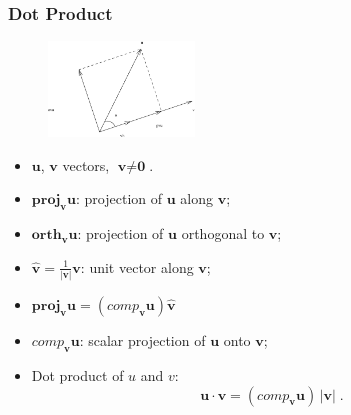 \begin{frame}
 \frametitle{Dot Product}

\begin{figure}[h]
  \includegraphics[height=1in]{../images/ok-dot_product.eps}
\end{figure}

\begin{itemize}
\item $\textbf{u}$, $\textbf{v}$ vectors, $\textbf{v}\neq \textbf{0}$.

\item $\textbf{proj}_{\bm{v}} \textbf{u}$: projection of $\textbf{u}$ along $\textbf{v}$;

  \item $\textbf{orth}_{\bm{v}} \textbf{u}$: projection of $\textbf{u}$ orthogonal to $\textbf{v}$;

  \item $\hat{\textbf{v}} = \frac{1}{|\textbf{v}|} \textbf{v}$: unit vector along $\textbf{v}$;

  \item $\textbf{proj}_{\bm{v}} \textbf{u} = (comp_{\bm{v}} \textbf{u}) \hat{\textbf{v}}$

  \item $comp_{\bm{v}} \textbf{u}$: scalar projection of $\textbf{u}$ onto $\textbf{v}$;

  \item Dot product of $u$ and $v$:
%
$$\textbf{u} \cdot \textbf{v} = (comp_{\bm{v}} \textbf{u}) \, |\textbf{v}|\; .$$
\end{itemize}

\end{frame}

